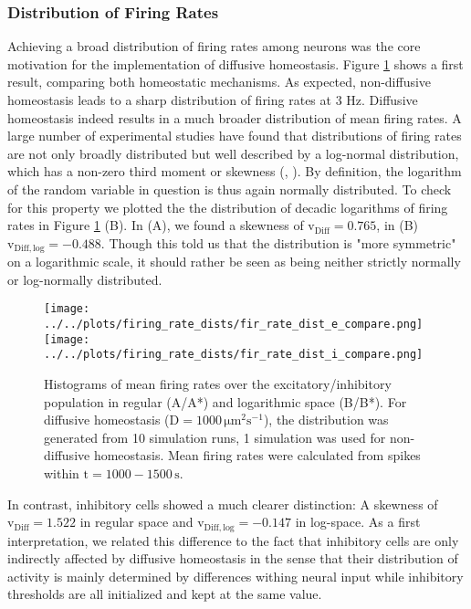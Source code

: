 \documentclass[10pt,a4paper]{article}
\begin{document}
\subsubsection{Distribution of Firing Rates}\label{Fir_Dist_Section}
Achieving a broad distribution of firing rates among neurons was the core motivation for the implementation of diffusive homeostasis. Figure \ref{Fir_Rate_Dist_Compare} shows a first result, comparing both homeostatic mechanisms. As expected, non-diffusive homeostasis leads to a sharp distribution of firing rates at 3 Hz. Diffusive homeostasis indeed results in a much broader distribution of mean firing rates. A large number of experimental studies have found that distributions of firing rates are not only broadly distributed but well described by a log-normal distribution, which has a non-zero third moment or skewness (\cite{Buzsaki_Fir_Rates_2014}, \cite{Wohrer_Fir_Rates_2012}). By definition, the logarithm of the random variable in question is thus again normally distributed. To check for this property we plotted the the distribution of decadic logarithms of firing rates in Figure \ref{Fir_Rate_Dist_Compare} (B). In (A), we found a skewness of $\mathrm{v_{Diff} = 0.765}$, in (B) $\mathrm{v_{Diff,log} = -0.488}$. Though this told us that the distribution is "more symmetric" on a logarithmic scale, it should rather be seen as being neither strictly normally or log-normally distributed.  
\begin{figure}
\texttt{[image: ../../plots/firing\_rate\_dists/fir\_rate\_dist\_e\_compare.png]}
\texttt{[image: ../../plots/firing\_rate\_dists/fir\_rate\_dist\_i\_compare.png]}
\caption{Histograms of mean firing rates over the excitatory/inhibitory population in regular (A/A*) and logarithmic space (B/B*). For diffusive homeostasis ($\mathrm{D=1000\, \mu m^2 s^{-1}}$), the distribution was generated from 10 simulation runs, 1 simulation was used for non-diffusive homeostasis. Mean firing rates were calculated from spikes within $\mathrm{t=1000-1500\,s}$.}
\label{Fir_Rate_Dist_Compare}
\end{figure}
In contrast, inhibitory cells showed a much clearer distinction: A skewness of $\mathrm{v_{Diff} = 1.522}$ in regular space and $\mathrm{v_{Diff,log} = -0.147}$ in log-space. As a first interpretation, we related this difference to the fact that inhibitory cells are only indirectly affected by diffusive homeostasis in the sense that their distribution of activity is mainly determined by differences withing neural input while inhibitory thresholds are all initialized and kept at the same value.
\end{document}
